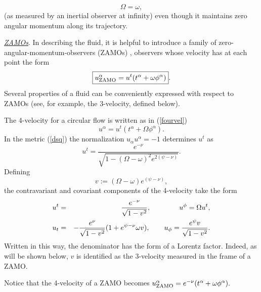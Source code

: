 \documentclass[12pt]{article}
\def\be{\begin{equation}}
\def\ee{\end{equation}}
\def\ba{\begin{eqnarray}}
\def\ea{\end{eqnarray}}
\begin{document}
\begin{equation}
\Omega=\omega,
\end{equation}
(as measured by an inertial observer at infinity) even though it maintains zero angular momentum along its
trajectory. 

\vskip0.8cm

\noindent \textit{\uline{ZAMOs}}. In describing the fluid, it is helpful to introduce  
a family of zero-angular-momentum-observers 
(ZAMOs) \cite{Bardeen70,Bardeen73}, observers whose velocity 
has at each point the form \be 
%
%
\boxed{u_{\rm ZAMO}^\alpha = u^t(t^\alpha +\omega \phi^\alpha)}.
\label{eq:uzamo}\index{ZAMO (zero-angular-momentum observer)}
\ee
Several properties of a fluid can be 
conveniently expressed with respect to ZAMOs (see, for example, 
the 3-velocity, defined below). 

\vskip0.8cm
 The 4-velocity for a circular flow is written 
as in (\ref{fourvel})
\begin{equation}
     u^\alpha = u^t (t^\alpha + \Omega \phi^\alpha).
\label{vel}
\end{equation}
In the metric (\ref{dsq}) the normalization $u_\alpha u^\alpha=-1$ 
determines $u^t$ as
\begin{equation}
u^t=\frac{e^{-\nu}}{\sqrt{1-(\Omega-\omega)^2e^{2(\psi-\nu)}}}.
\end{equation}
Defining 
\begin{equation}
v:=(\Omega-\omega)e^{(\psi-\nu)},
\label{3vel}
\end{equation}
the contravariant and covariant components of the 4-velocity take
the form
\ba
u^t &=& {e^{-\nu}\over{{\sqrt{1-v^2}}}},\qquad \qquad 
u^{\phi} = \Omega u^t ,\label{utphi} \\
u_t &=& -\frac{e^\nu}{\sqrt{1-v^2}}(1+e^{\psi-\nu}\omega v ), \qquad
u_{\phi} = \frac{e^\psi v}{\sqrt{1-v^2}}.
\label{ultphi}\index{rotating stars!velocity}\index{velocity!rotating star}
\ea
Written in this way, the denominator has the form of a Lorentz factor. 
Indeed, as will be shown below, $v$ is identified as the 3-velocity
measured in the frame of a ZAMO.

Notice that the 4-velocity of a ZAMO becomes $u_{\rm ZAMO}^\alpha = e^{-\nu}(t^\alpha +\omega \phi^\alpha).$

\vskip0.8cm
\end{document}
